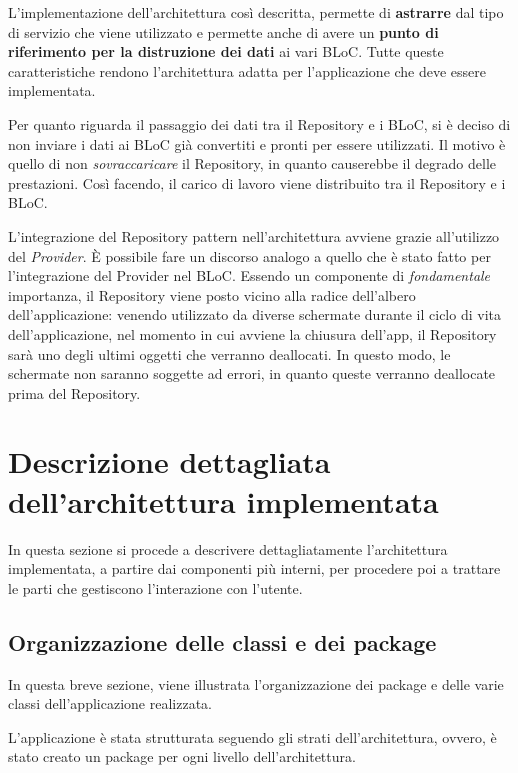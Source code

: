L'implementazione dell'architettura così descritta, permette di \textbf{astrarre} dal tipo di servizio che viene utilizzato e permette anche di avere un \textbf{punto di riferimento per la distruzione dei dati} ai vari BLoC. Tutte queste caratteristiche rendono l'architettura adatta per l'applicazione che deve essere implementata.

Per quanto riguarda il passaggio dei dati tra il Repository e i BLoC, si è deciso di non inviare i dati ai BLoC già convertiti e pronti per essere utilizzati. Il motivo è quello di non \textit{sovraccaricare} il Repository, in quanto causerebbe il degrado delle prestazioni. Così facendo, il carico di lavoro viene distribuito tra il Repository e i BLoC.

L'integrazione del Repository pattern nell'architettura avviene grazie all'utilizzo del \textit{Provider}. È possibile fare un discorso analogo a quello che è stato fatto per l'integrazione del Provider nel BLoC. Essendo un componente di \textit{fondamentale} importanza, il Repository viene posto vicino alla radice dell'albero dell'applicazione: venendo utilizzato da diverse schermate durante il ciclo di vita dell'applicazione, nel momento in cui avviene la chiusura dell'app, il Repository sarà uno degli ultimi oggetti che verranno deallocati. In questo modo, le schermate non saranno soggette ad errori, in quanto queste verranno deallocate prima del Repository.

\section{Descrizione dettagliata dell'architettura implementata}
In questa sezione si procede a descrivere dettagliatamente l'architettura implementata, a partire dai componenti più interni, per procedere poi a trattare le parti che gestiscono l'interazione con l'utente.

\subsection{Organizzazione delle classi e dei package}
In questa breve sezione, viene illustrata l'organizzazione dei package e delle varie classi dell'applicazione realizzata.

L'applicazione è stata strutturata seguendo gli strati dell'architettura, ovvero, è stato creato un package per ogni livello dell'architettura.

